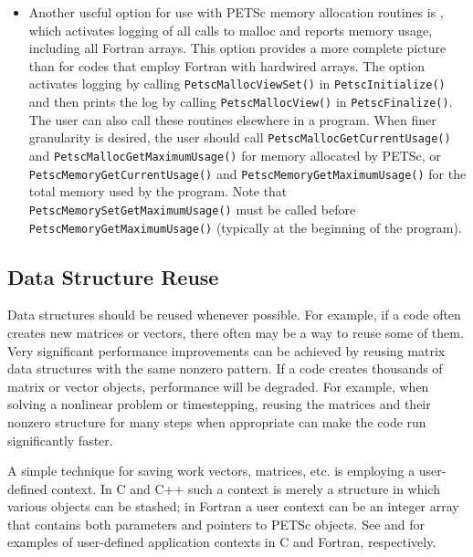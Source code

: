 {{{\begin{itemize}
\item Another useful option for use with PETSc memory allocation
routines is , which activates logging of all calls
to malloc and reports memory usage, including all Fortran arrays.
This option provides a more complete picture than  for
codes that employ Fortran with hardwired arrays.  The option
 activates logging by calling \lstinline{PetscMallocViewSet()} in
\lstinline{PetscInitialize()} and then prints the log by calling \lstinline{PetscMallocView()}
in \lstinline{PetscFinalize()}.  The user can also call these routines elsewhere in a
program.  When finer granularity is desired, the user should call
\break\lstinline{PetscMallocGetCurrentUsage()} and \lstinline{PetscMallocGetMaximumUsage()} for memory
allocated by PETSc, or \break\lstinline{PetscMemoryGetCurrentUsage()} and
\lstinline{PetscMemoryGetMaximumUsage()} for the total memory used by the program.
Note that \lstinline{PetscMemorySetGetMaximumUsage()} must be called before
\lstinline{PetscMemoryGetMaximumUsage()} (typically at the beginning of the program).
\end{itemize}


\subsection{Data Structure Reuse}
\label{sec_dsreuse}

Data structures should be reused whenever possible.  For example, if a code often
creates new matrices or vectors, there often may be a way to reuse some
of them.  Very significant performance improvements can be achieved by
reusing matrix data structures with the same nonzero pattern.  If a code
creates thousands of matrix or vector objects, performance will be
degraded.  For example, when solving a nonlinear problem or timestepping,
reusing the matrices and their nonzero structure for many steps when
 appropriate can make the code run significantly faster.

A simple technique for saving work vectors, matrices, etc. is employing
a user-defined context.  In C and C++ such a context is merely a
structure in which various objects can be stashed; in Fortran a user
context can be an integer array that contains both parameters and pointers
to PETSc objects. See \href{https://www.mcs.anl.gov/petsc/petsc-current/src/snes/tutorials/ex5.c.html}{} and
\href{https://www.mcs.anl.gov/petsc/petsc-current/src/snes/tutorials/ex5f.F90.html}{} for examples of user-defined application
contexts in C and Fortran, respectively.

}}}
